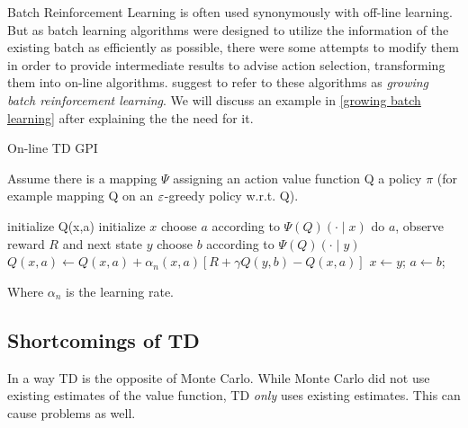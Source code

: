 Batch Reinforcement Learning is often used synonymously with off-line learning. But as batch learning algorithms were designed to utilize the information of the existing batch as efficiently as possible, there were some attempts to modify them in order to provide intermediate results to advise action selection, transforming them into on-line algorithms. \textcite{langeBatchReinforcementLearning2012} suggest to refer to these algorithms as \emph{growing batch reinforcement learning}. We will discuss an example in \ref{growing batch learning} after explaining the the need for it. 

\begin{algorithm}
	\caption{On-line TD GPI \parencite{suttonReinforcementLearningIntroduction2018a}}
	Assume there is a mapping \(\Psi\) assigning an action value function Q a policy \(\pi\) (for example mapping Q on an \(\varepsilon\)-greedy policy w.r.t. Q).
	\begin{algorithmic}[1]
		\State initialize Q(x,a)
		 
			\State initialize \(x\) 
			\State choose \(a\) according to \(\Psi(Q)(\cdot \mid x)\)
			\Repeat {}
				\State do \(a\), observe reward \(R\) and next state \(y\)
				\State choose \(b\) according to \(\Psi(Q)(\cdot \mid y)\)
				\State \(Q(x,a)\gets Q(x,a) + \alpha_n(x,a) [R+\gamma Q(y,b) -Q(x,a) ]\)
				\State \(x\gets y\); \(a\gets b \); 
		\EndWhile
	\end{algorithmic}
	Where \(\alpha_n\) is the learning rate.
\end{algorithm}

\subsection{Shortcomings of TD} \label{shortcomings TD}
In a way TD is the opposite of Monte Carlo. While Monte Carlo did not use existing estimates of the value function, TD \emph{only} uses existing estimates. This can cause problems as well.


\begin{wrapfigure}{r}{6cm}
	\begin{center}
	\end{center}
\end{wrapfigure}

